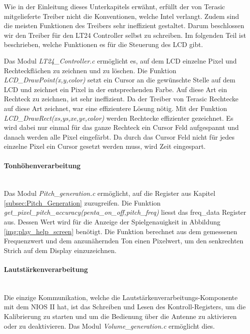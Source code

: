 Wie in der Einleitung dieses Unterkapitels erwähnt, erfüllt der von Terasic mitgelieferte Treiber nicht die Konventionen, welche Intel verlangt. Zudem sind die meisten Funktionen des Treibers sehr ineffizient gestaltet. Darum beschlossen wir den Treiber für den LT24 Controller selbst zu schreiben. Im folgenden Teil ist beschrieben, welche Funktionen es für die Steuerung des LCD gibt.

Das Modul \textit{LT24\_Controller.c} ermöglicht es, auf dem LCD einzelne Pixel und Rechteckflächen zu zeichnen und zu löschen. Die Funktion \textit{LCD\_DrawPoint(x,y,color)} setzt ein Cursor an die gewünschte Stelle auf dem LCD und zeichnet ein Pixel in der entsprechenden Farbe. Auf diese Art ein Rechteck zu zeichnen, ist sehr ineffizient. Da der Treiber von Terasic Rechtecke auf diese Art zeichnet, war eine effizientere Lösung nötig. Mit der Funktion \textit{LCD\_DrawRect(xs,ys,xe,ye,color)} werden Rechtecke effizienter gezeichnet. Es wird dabei nur einmal für das ganze Rechteck ein Cursor Feld aufgespannt und danach werden alle Pixel eingefärbt. Da durch das Cursor Feld nicht für jedes einzelne Pixel ein Cursor gesetzt werden muss, wird Zeit eingespart. 

\paragraph{Tonhöhenverarbeitung}\mbox{}\\

Das Modul \textit{Pitch\_generation.c} ermöglicht, auf die Register aus Kapitel \ref{subsec:Pitch_Generation} zuzugreifen.
Die Funktion \textit{get\_pixel\_pitch\_accuracy(penta\_on\_off,pitch\_freq)} liesst das freq\_data Register aus. Dessen Wert wird für die Anzeige der Spielgenauigkeit in Abbildung \ref{img:play_help_screen} benötigt. Die Funktion berechnet aus dem gemessenen Frequenzwert und dem anzunähernden Ton einen Pixelwert, um den senkrechten Strich auf dem Display einzuzeichnen.


\paragraph{Lautstärkenverarbeitung}\mbox{}\\
Die einzige Kommunikation, welche die Lautstärkenverarbeitungs-Komponente mit dem NIOS II hat, ist das Schreiben und Lesen des Kontroll-Registers, um die Kalibrierung zu starten und um die Bedienung über die Antenne zu aktivieren oder zu deaktivieren. Das Modul \textit{Volume\_generation.c} ermöglicht dies. 